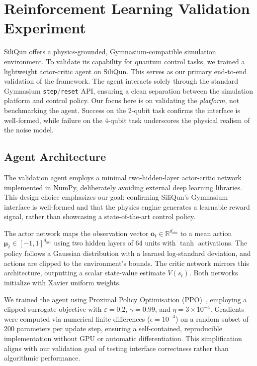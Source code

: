 \section{Reinforcement Learning Validation Experiment}
\label{sec:drl_agent}

SiliQun offers a physics-grounded, Gymnasium-compatible simulation environment. To validate its capability for quantum control tasks, we trained a lightweight actor-critic agent on SiliQun. This serves as our primary end-to-end validation of the framework. The agent interacts solely through the standard Gymnasium \texttt{step}/\texttt{reset} API, ensuring a clean separation between the simulation platform and control policy. Our focus here is on validating the \emph{platform}, not benchmarking the agent. Success on the 2-qubit task confirms the interface is well-formed, while failure on the 4-qubit task underscores the physical realism of the noise model.

\subsection{Agent Architecture}
\label{subsec:agent_arch}

The validation agent employs a minimal two-hidden-layer actor-critic network implemented in NumPy, deliberately avoiding external deep learning libraries. This design choice emphasizes our goal: confirming SiliQun's Gymnasium interface is well-formed and that the physics engine generates a learnable reward signal, rather than showcasing a state-of-the-art control policy.

The actor network maps the observation vector $\mathbf{o}_t \in \mathbb{R}^{d_\text{obs}}$ to a mean action $\boldsymbol{\mu}_t \in [-1,1]^{d_\text{act}}$ using two hidden layers of 64 units with $\tanh$ activations. The policy follows a Gaussian distribution with a learned log-standard deviation, and actions are clipped to the environment's bounds. The critic network mirrors this architecture, outputting a scalar state-value estimate $V(s_t)$. Both networks initialize with Xavier uniform weights.

We trained the agent using Proximal Policy Optimisation (PPO)~\cite{Schulman2017}, employing a clipped surrogate objective with $\varepsilon = 0.2$, $\gamma = 0.99$, and $\eta = 3 \times 10^{-4}$. Gradients were computed via numerical finite differences ($\epsilon = 10^{-4}$) on a random subset of 200 parameters per update step, ensuring a self-contained, reproducible implementation without GPU or automatic differentiation. This simplification aligns with our validation goal of testing interface correctness rather than algorithmic performance.

